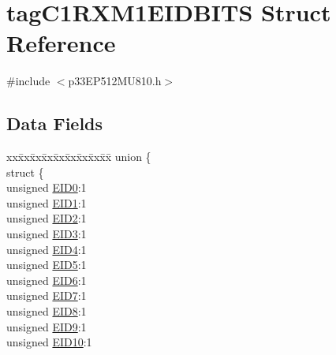 \hypertarget{structtag_c1_r_x_m1_e_i_d_b_i_t_s}{}\section{tag\+C1\+R\+X\+M1\+E\+I\+D\+B\+I\+TS Struct Reference}
\label{structtag_c1_r_x_m1_e_i_d_b_i_t_s}


{\ttfamily \#include $<$p33\+E\+P512\+M\+U810.\+h$>$}

\subsection*{Data Fields}
\begin{DoxyCompactItemize}
\item 
\begin{tabbing}
xx\=xx\=xx\=xx\=xx\=xx\=xx\=xx\=xx\=\kill
union \{\\
\>struct \{\\
\>\>unsigned \hyperlink{structtag_c1_r_x_m1_e_i_d_b_i_t_s_a9da8b7b30247e4f9cd8cc056549aa9fd}{EID0}:1\\
\>\>unsigned \hyperlink{structtag_c1_r_x_m1_e_i_d_b_i_t_s_afd6c139491d147c1262f3d051c6691e9}{EID1}:1\\
\>\>unsigned \hyperlink{structtag_c1_r_x_m1_e_i_d_b_i_t_s_a36ec62d8d3c5acd5d15e6691dc099a94}{EID2}:1\\
\>\>unsigned \hyperlink{structtag_c1_r_x_m1_e_i_d_b_i_t_s_ab895f7d0ac289a0383b607cbc62eebe2}{EID3}:1\\
\>\>unsigned \hyperlink{structtag_c1_r_x_m1_e_i_d_b_i_t_s_a136d5a709d6618d40acceccb43036656}{EID4}:1\\
\>\>unsigned \hyperlink{structtag_c1_r_x_m1_e_i_d_b_i_t_s_a8dffb2d86a6c184df505ae7c71a58710}{EID5}:1\\
\>\>unsigned \hyperlink{structtag_c1_r_x_m1_e_i_d_b_i_t_s_af8a8574102515d8f1a4b7fd1685d0532}{EID6}:1\\
\>\>unsigned \hyperlink{structtag_c1_r_x_m1_e_i_d_b_i_t_s_a84c3262e67f8d5fd387ac10bde6fa9b1}{EID7}:1\\
\>\>unsigned \hyperlink{structtag_c1_r_x_m1_e_i_d_b_i_t_s_acca25e0b7d86eb499d01f85222baea87}{EID8}:1\\
\>\>unsigned \hyperlink{structtag_c1_r_x_m1_e_i_d_b_i_t_s_ac6748f73d4ada8538b06548be4f396c2}{EID9}:1\\
\>\>unsigned \hyperlink{structtag_c1_r_x_m1_e_i_d_b_i_t_s_a9cea8e77ecbb72bd3b08102412793725}{EID10}:1\\

\end{tabbing}
\end{DoxyCompactItemize}
